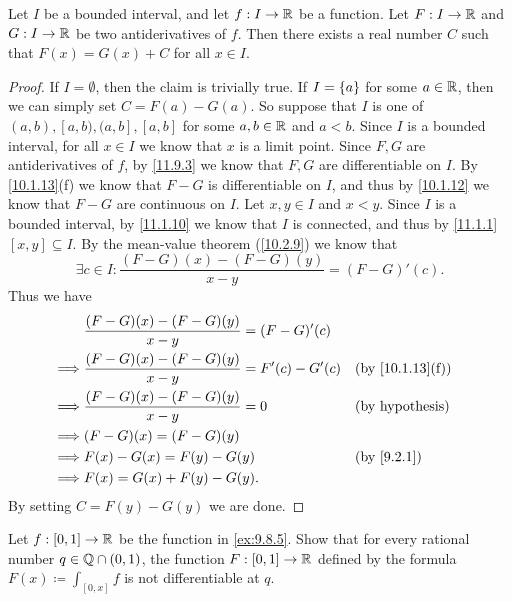 \begin{lem}\label{11.9.5}
  Let \(I\) be a bounded interval, and let \(f : I \to \mathbb{R}\) be a function.
  Let \(F : I \to \mathbb{R}\) and \(G : I \to \mathbb{R}\) be two antiderivatives of \(f\).
  Then there exists a real number \(C\) such that \(F(x) = G(x) + C\) for all \(x \in I\).
\end{lem}

\begin{proof}
  If \(I = \emptyset\), then the claim is trivially true.
  If \(I = \left\lbrace a\right\rbrace\) for some \(a \in \mathbb{R}\), then we can simply set \(C = F(a) - G(a)\).
  So suppose that \(I\) is one of \((a, b), [a, b), (a, b], [a, b]\) for some \(a, b \in \mathbb{R}\) and \(a < b\).
  Since \(I\) is a bounded interval, for all \(x \in I\) we know that \(x\) is a limit point.
  Since \(F, G\) are antiderivatives of \(f\), by \cref{11.9.3} we know that \(F, G\) are differentiable on \(I\).
  By \cref{10.1.13}(f) we know that \(F - G\) is differentiable on \(I\), and thus by \cref{10.1.12} we know that \(F - G\) are continuous on \(I\).
  Let \(x, y \in I\) and \(x < y\).
  Since \(I\) is a bounded interval, by \cref{11.1.10} we know that \(I\) is connected, and thus by \cref{11.1.1} \([x, y] \subseteq I\).
  By the mean-value theorem (\cref{10.2.9}) we know that
  \[
    \exists c \in I : \dfrac{(F - G)(x) - (F - G)(y)}{x - y} = (F - G)'(c).
  \]
  Thus we have
  \begin{align*}
             & \dfrac{(F - G)(x) - (F - G)(y)}{x - y} = (F - G)'(c)                               \\
    \implies & \dfrac{(F - G)(x) - (F - G)(y)}{x - y} = F'(c) - G'(c) &  & \by{10.1.13}[f]        \\
    \implies & \dfrac{(F - G)(x) - (F - G)(y)}{x - y} = 0             &  & \text{(by hypothesis)} \\
    \implies & (F - G)(x) = (F - G)(y)                                                            \\
    \implies & F(x) - G(x) = F(y) - G(y)                              &  & \by{9.2.1}             \\
    \implies & F(x) = G(x) + F(y) - G(y).
  \end{align*}
  By setting \(C = F(y) - G(y)\) we are done.
\end{proof}

\exercisesection

\begin{ex}\label{ex:11.9.1}
  Let \(f : [0, 1] \to \mathbb{R}\) be the function in \cref{ex:9.8.5}.
  Show that for every rational number \(q \in \mathbb{Q} \cap (0, 1)\), the function \(F : [0, 1] \to \mathbb{R}\) defined by the formula \(F(x) \coloneqq \int_{[0, x]} f\) is not differentiable at \(q\).
\end{ex}


